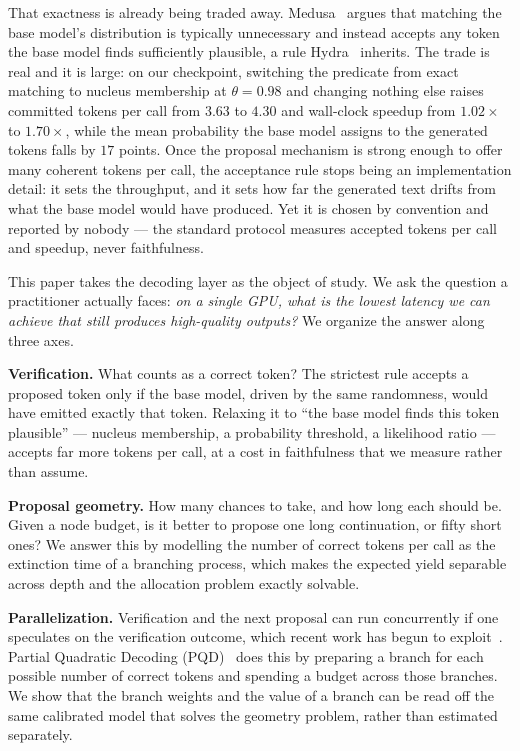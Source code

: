 \documentclass{article} %
\makeatletter
\newenvironment{ai}
  {\color{lightgray}%
   \@ifpackageloaded{caption}{\captionsetup{font={color=lightgray}}}{}%
   \let\ai@savedfloatreset\@floatboxreset
   \g@addto@macro\@floatboxreset{\color{lightgray}}}
  {\global\let\@floatboxreset\ai@savedfloatreset}
\makeatother
\begin{document}
\begin{ai}
That exactness is already being traded away. Medusa~\citep{cai2024medusa} argues
that matching the base model's distribution is typically unnecessary and instead
accepts any token the base model finds sufficiently plausible, a rule
Hydra~\citep{ankner2024hydra} inherits. The trade is real and it is large: on our
checkpoint, switching the predicate from exact matching to nucleus membership at
$\theta = 0.98$ and changing nothing else raises committed tokens per call from
$3.63$ to $4.30$ and wall-clock speedup from $1.02\times$ to $1.70\times$, while
the mean probability the base model assigns to the generated tokens falls by
$17$ points. Once the proposal mechanism is strong enough to offer many coherent
tokens per call, the acceptance rule stops being an implementation detail: it
sets the throughput, and it sets how far the generated text drifts from what the
base model would have produced. Yet it is chosen by convention and reported by
nobody --- the standard protocol measures accepted tokens per call and speedup,
never faithfulness.

This paper takes the decoding layer as the object of study. We ask the question
a practitioner actually faces: \emph{on a single GPU, what is the lowest latency
we can achieve that still produces high-quality outputs?} We organize the answer
along three axes.

\textbf{Verification.} What counts as a correct token? The strictest rule accepts
a proposed token only if the base model, driven by the same randomness, would have
emitted exactly that token. Relaxing it to ``the base model finds this token
plausible'' --- nucleus membership, a probability threshold, a likelihood ratio
--- accepts far more tokens per call, at a cost in faithfulness that we measure
rather than assume.

\textbf{Proposal geometry.} How many chances to take, and how long each should
be. Given a node budget, is it better to propose one long continuation, or fifty
short ones? We answer this by modelling the number of correct tokens per call as
the extinction time of a branching process, which makes the expected yield
separable across depth and the allocation problem exactly solvable.

\textbf{Parallelization.} Verification and the next proposal can run
concurrently if one speculates on the verification outcome, which recent work
has begun to exploit~\citep{samragh2025future,draxler2025ptp}. Partial Quadratic
Decoding (PQD)~\citep{draxler2025ptp} does this by preparing a branch for each
possible number of correct tokens and spending a budget across those branches. We
show that the branch weights and the value of a branch can be read off the same
calibrated model that solves the geometry problem, rather than estimated
separately.


\end{ai}
\end{document}
